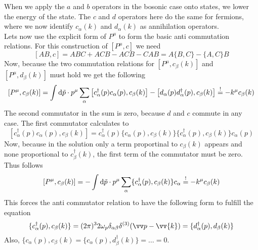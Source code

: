 When we apply the $a$ and $b$ operators in the bosonic case onto states, we lower the energy of the state. The $c$ and $d$ operators here do the same for fermions, where we now identify $c_\alpha(k)$ and $d_\alpha(k)$ as annihilation operators.\\
Lets now use the explicit form of $P^\mu $ to form the basic anti commutation relations. 
For this construction of $[P^\mu, c]$ we need
\[ [AB,c] = ABC + ACB - ACB - CAB = A\{B,C\} - \{A,C\}B\]
Now, because the two commutation relations for $[P^\mu, c_\beta(k)]$ and $[P^\mu, d_\beta(k)]$ must hold we get the following
\[ [P^\mu , c_{\beta}(k)] = \int {\rm d} \tilde p \cdot p^\mu \sum_\alpha \left[ c_\alpha^\dagger(p)c_\alpha(p), c_\beta(k)\right] - \left[ d_\alpha(p)d_\alpha^\dagger(p), c_\beta(k)\right] \overset{!}{=} -k^\mu c_\beta(k)\]
The second commutator in the sum is zero, because $d$ and $c$ commute in any case. 
The first commutator calculates to 
\[ \left[ c_\alpha^\dagger(p) c_\alpha(p), c_\beta(k)\right] = c_\alpha^\dagger(p) \{c_\alpha(p), c_\beta(k)\}  \{c_\alpha^\dagger(p), c_\beta(k)\} c_\alpha(p)\]
Now, because in the solution only a term proportinal to $c_\beta(k)$ appears and none proportional to $c^\dagger_\beta(k)$, the first term of the commutator must be zero.
Thus follows
\[ [P^\mu, c_\beta(k)] = - \int {\rm d} \tilde p \cdot p^\mu \sum_\alpha \{c_\alpha^\dagger(p), c_\beta(k)\} c_\alpha \overset{!}{=} -k^\mu c_\beta(k)\]
This forces the anti commutator relation to have the following form to fulfill the equation
\[ \{c_\alpha^\dagger(p), c_\beta(k)\} = (2\pi)^3 2 \omega_p \delta_{\alpha\beta} \delta^{(3)}(\vp - \vv{k}) = \{d_\alpha^\dagger(p), d_\beta(k)\}\]
Also, $\{c_\alpha(p), c_\beta(k) = \{c_\alpha(p), d_\beta^\dagger(k)\} = \ldots = 0$.
